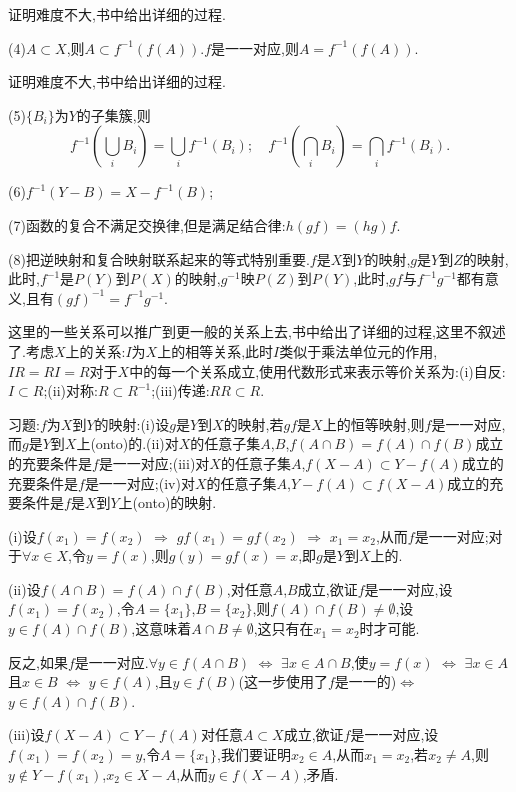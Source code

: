 \documentclass[12pt,a4paper,openany]{book}
\begin{document}
证明难度不大,书中给出详细的过程.

(4)$A \subset X$,则$A \subset f^{-1}(f(A))$.$f$是一一对应,则$A = f^{-1}(f(A))$.

证明难度不大,书中给出详细的过程.

(5)$\{B_i\}$为$Y$的子集簇,则
\[
f^{-1}(\bigcup_{i}{B_i}) = \bigcup_{i}{f^{-1}(B_i)};\quad f^{-1}(\bigcap_{i}{B_i}) = \bigcap_{i}{f^{-1}(B_i)}.
\]

(6)$f^{-1}(Y-B) = X - f^{-1}(B)$;

(7)函数的复合不满足交换律,但是满足结合律:$h(gf)=(hg)f$.

(8)把逆映射和复合映射联系起来的等式特别重要.$f$是$X$到$Y$的映射,$g$是$Y$到$Z$的映射,此时,$f^{-1}$是$P(Y)$到$P(X)$的映射,$g^{-1}$映$P(Z)$到$P(Y)$,此时,$gf$与$f^{-1}g^{-1}$都有意义,且有$(gf)^{-1}=f^{-1}g^{-1}$.

这里的一些关系可以推广到更一般的关系上去,书中给出了详细的过程,这里不叙述了.考虑$X$上的关系:$I$为$X$上的相等关系,此时$I$类似于乘法单位元的作用,$IR=RI=R$对于$X$中的每一个关系成立,使用代数形式来表示等价关系为:(i)自反:$I \subset R$;(ii)对称:$R \subset R^{-1}$;(iii)传递:$RR \subset R$.

习题:$f$为$X$到$Y$的映射:(i)设$g$是$Y$到$X$的映射,若$gf$是$X$上的恒等映射,则$f$是一一对应,而$g$是$Y$到$X$上(onto)的.(ii)对$X$的任意子集$A$,$B$,$f(A \cap B)=f(A) \cap f(B)$成立的充要条件是$f$是一一对应;(iii)对$X$的任意子集$A$,$f(X-A) \subset Y-f(A)$成立的充要条件是$f$是一一对应;(iv)对$X$的任意子集$A$,$Y-f(A) \subset f(X-A)$成立的充要条件是$f$是$X$到$Y$上(onto)的映射.

(i)设$f(x_1)=f(x_2)$ $\Rightarrow$ $gf(x_1)=gf(x_2)$ $\Rightarrow$ $x_1=x_2$,从而$f$是一一对应;对于$\forall x \in X$,令$y=f(x)$,则$g(y)=gf(x)=x$,即$g$是$Y$到$X$上的.

(ii)设$f(A \cap B) = f(A) \cap f(B)$,对任意$A$,$B$成立,欲证$f$是一一对应,设$f(x_1)=f(x_2)$,令$A=\{x_1\}$,$B=\{x_2\}$,则$f(A) \cap f(B) \neq \emptyset$,设$y \in f(A) \cap f(B)$,这意味着$A \cap B \neq \emptyset$,这只有在$x_1=x_2$时才可能.

反之,如果$f$是一一对应.$\forall y \in f(A \cap B)$ $\Leftrightarrow$ $\exists x \in A \cap B$,使$y=f(x)$ $\Leftrightarrow$ $\exists x \in A$且$x \in B$ $\Leftrightarrow$ $y \in f(A)$,且$y \in f(B)$(这一步使用了$f$是一一的)$\Leftrightarrow$ $y \in f(A) \cap f(B)$.

(iii)设$f(X-A) \subset Y-f(A)$对任意$A \subset X$成立,欲证$f$是一一对应,设$f(x_1)=f(x_2)=y$,令$A=\{x_1\}$,我们要证明$x_2 \in A$,从而$x_1=x_2$,若$x_2 \neq A$,则$y \notin Y - f(x_1)$,$x_2 \in X-A$,从而$y \in f(X-A)$,矛盾.
\end{document}
